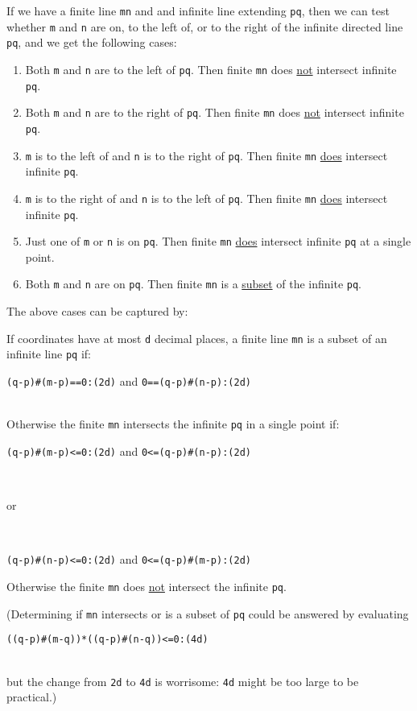 \documentclass[12pt]{article}
\begin{document}
If we have a finite line {\tt mn} and and infinite line extending
{\tt pq}, then we can test whether {\tt m} and {\tt n} are on, to the left of,
or to the right of the infinite directed line {\tt pq}, and we get the
following cases:
\begin{enumerate}
\item Both {\tt m} and {\tt n} are to the left of {\tt pq}.
Then finite {\tt mn} does \underline{not} intersect infinite {\tt pq}.
\item Both {\tt m} and {\tt n} are to the right of {\tt pq}.
Then finite {\tt mn} does \underline{not} intersect infinite {\tt pq}.
\item {\tt m} is to the left of and {\tt n} is to the right of {\tt pq}.
Then finite {\tt mn} \underline{does} intersect infinite {\tt pq}.
\item {\tt m} is to the right of and {\tt n} is to the left of {\tt pq}.
Then finite {\tt mn} \underline{does} intersect infinite {\tt pq}.
\item Just one of {\tt m} or {\tt n} is on {\tt pq}.
Then finite {\tt mn} \underline{does} intersect infinite {\tt pq}
at a single point.
\item Both {\tt m} and {\tt n} are on {\tt pq}.
Then finite {\tt mn} is a \underline{subset} of the infinite {\tt pq}.
\end{enumerate}

The above cases can be captured by:
\begin{lemma}
If coordinates have at most {\tt d} decimal places,
a finite line {\tt mn} is a subset of an infinite line {\tt pq} if:
\\[1ex]
\centerline{{\tt (q-p)\#(m-p)==0:(2d)} and {\tt 0==(q-p)\#(n-p):(2d)}}
\\[1ex]
Otherwise the finite {\tt mn} intersects the infinite {\tt pq}
in a single point if:
\\[1ex]
\centerline{{\tt (q-p)\#(m-p)<=0:(2d)} and {\tt 0<=(q-p)\#(n-p):(2d)}} \\
\centerline{or} \\
\centerline{{\tt (q-p)\#(n-p)<=0:(2d)} and {\tt 0<=(q-p)\#(m-p):(2d)}}
Otherwise the finite {\tt mn} does \underline{not} intersect
the infinite {\tt pq}.
\end{lemma}

(Determining if {\tt mn} intersects or is a subset of {\tt pq}
could be answered by evaluating \\
\centerline{{\tt ((q-p)\#(m-q))*((q-p)\#(n-q))<=0:(4d)}} \\
but the change from {\tt 2d} to {\tt 4d} is worrisome: {\tt 4d} might
be too large to be practical.)
\end{document}
